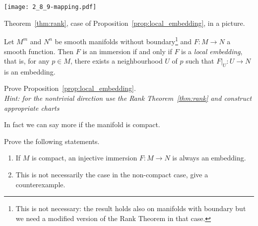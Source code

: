 \begin{marginfigure}
	\texttt{[image: 2\_8\_9-mapping.pdf]}
	\caption{Theorem~\ref{thm:rank}, case of Proposition~\ref{prop:local_embedding}, in a picture.}
\end{marginfigure}
\begin{proposition}\label{prop:local_embedding}
	Let $M^m$ and $N^n$ be smooth manifolds without boundary\footnote{This is not necessary: the result holds also on manifolds with boundary but we need a modified version of the Rank Theorem in that case.} and $F:M\to N$ a smooth function.
	Then $F$ is an immersion if and only if $F$ is a \emph{local embedding}, that is, for any $p\in M$, there exists a neighbourhood $U$ of $p$ such that $F\big|_U : U \to N$ is an embedding.
\end{proposition}
\begin{exercise}
	Prove Proposition~\ref{prop:local_embedding}. \\
	\textit{\small Hint: for the nontrivial direction use the Rank Theorem~\ref{thm:rank} and construct appropriate charts}
\end{exercise}

In fact we can say more if the manifold is compact.

\begin{exercise}
	Prove the following statements.
	\begin{enumerate}
		\item If $M$ is compact, an injective immersion $F:M\to N$ is always an embedding.
		\item This is not necessarily the case in the non-compact case, give a counterexample.
	\end{enumerate}
\end{exercise}

